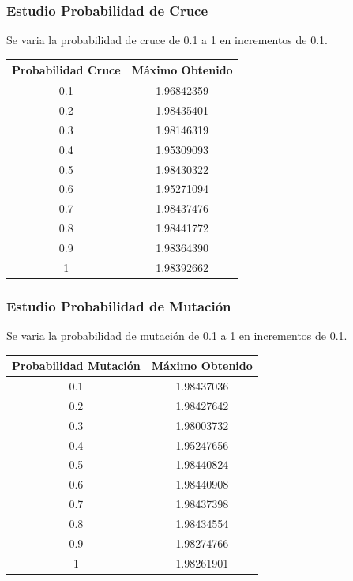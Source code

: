 \documentclass[12pt]{article}
\begin{document}
\subsubsection*{Estudio Probabilidad de Cruce}
	Se varia la probabilidad de cruce de 0.1 a 1 en incrementos de 0.1.
\begin{table}[H]
\begin{center}
\begin{tabular}{|cc|} \hline
Probabilidad Cruce & Máximo Obtenido \\  \hline
0.1 & 1.96842359 \\ 
0.2 & 1.98435401 \\ 
0.3 & 1.98146319 \\
0.4 & 1.95309093 \\
0.5 & 1.98430322 \\
0.6 & 1.95271094 \\
0.7 & 1.98437476 \\
0.8 & 1.98441772 \\ 
0.9 & 1.98364390 \\
1   & 1.98392662 \\  \hline
\end{tabular}
\end{center}
\end{table}
\subsubsection*{Estudio Probabilidad de Mutación}
	Se varia la probabilidad de mutación de 0.1 a 1 en incrementos de 0.1.
\begin{table}[H]
\begin{center}
\begin{tabular}{|cc|} \hline
Probabilidad Mutación & Máximo Obtenido \\  \hline
0.1 & 1.98437036 \\ 
0.2 & 1.98427642 \\ 
0.3 & 1.98003732 \\
0.4 & 1.95247656 \\
0.5 & 1.98440824 \\
0.6 & 1.98440908 \\
0.7 & 1.98437398 \\
0.8 & 1.98434554 \\ 
0.9 & 1.98274766 \\
1   & 1.98261901 \\  \hline
\end{tabular}
\end{center}
\end{table}
\end{document}
